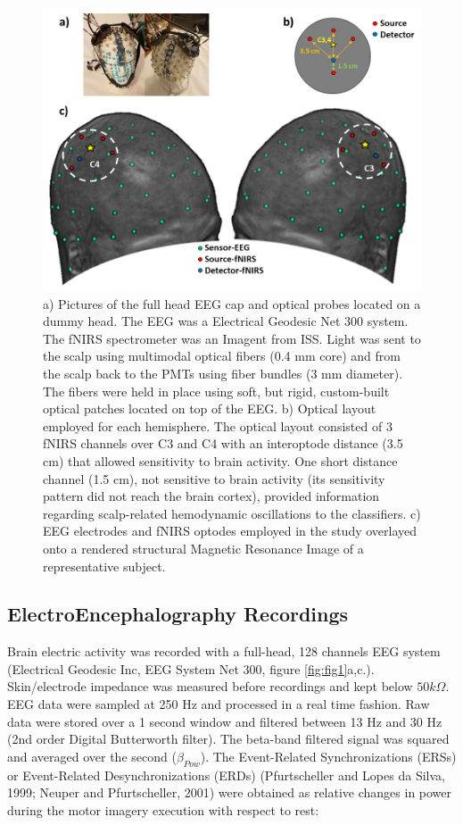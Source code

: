 \documentclass[12pt ]{iopart}
\begin{document}
\begin{figure}
	\includegraphics[width=\linewidth]{Slide2.JPG}
	\caption{a) Pictures of the full head EEG cap and optical probes located on a dummy head. The EEG was a Electrical Geodesic Net 300 system. The fNIRS spectrometer was an Imagent from ISS. Light was sent to the scalp using multimodal optical fibers (0.4 mm core) and from the scalp back to the PMTs using fiber bundles (3 mm diameter).  The fibers were held in place using soft, but rigid, custom-built optical patches located on top of the EEG. b) Optical layout employed for each hemisphere. The optical layout consisted of 3 fNIRS channels over C3 and C4 with an interoptode distance (3.5 cm) that allowed sensitivity to brain activity. One short distance channel (1.5 cm),  not sensitive to brain activity (its sensitivity pattern did not reach the brain cortex), provided information regarding scalp-related hemodynamic oscillations to the classifiers. c) EEG electrodes and fNIRS optodes employed in the study overlayed onto a rendered structural Magnetic Resonance Image of a representative subject. }
	\label{fig:fig2}
\end{figure}


\subsection{ElectroEncephalography Recordings}
Brain electric activity was recorded with a full-head, 128 channels EEG system (Electrical Geodesic Inc, EEG System Net 300, figure \ref{fig:fig1}a,c.).
Skin/electrode impedance was measured before recordings and kept below $50 k\Omega$. EEG data were sampled at 250 Hz and processed in a real time fashion.  Raw data were stored over a 1 second window and filtered between 13 Hz and 30 Hz (2nd order Digital Butterworth filter). The beta-band filtered signal was squared and averaged over the second ($\beta_{Pow}$).
 The Event-Related Synchronizations (ERSs) or Event-Related Desynchronizations (ERDs) (Pfurtscheller and Lopes da Silva, 1999; Neuper and Pfurtscheller, 2001) were obtained as relative changes in power during the motor imagery execution with respect to rest:
\end{document}
